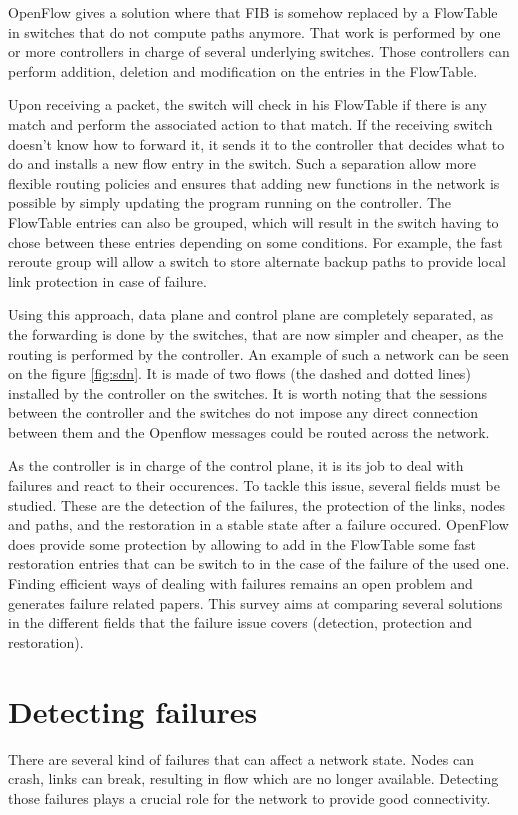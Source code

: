 \documentclass[]{IEEEtran}
\begin{document}
OpenFlow gives a solution where that FIB is somehow replaced by a FlowTable in switches that do not compute paths anymore. That work is performed by one or more controllers in charge of several underlying switches. Those controllers can perform addition, deletion and modification on the entries in the FlowTable.

Upon receiving a packet, the switch will check in his FlowTable if there is any match and perform the associated action to that match. If the receiving switch doesn't know how to forward it, it sends it to the controller that decides what to do and installs a new flow entry in the switch. Such a separation allow more flexible routing policies and ensures that adding new functions in the network is possible by simply updating the program running on the controller. The FlowTable entries can also be grouped, which will result in the switch having to chose between these entries depending on some conditions. For example, the fast reroute group will allow a switch to store alternate backup paths to provide local link protection in case of failure.

Using this approach, data plane and control plane are completely separated, as the forwarding is done by the switches, that are now simpler and cheaper, as the routing is performed by the controller. An example of such a network can be seen on the figure \ref{fig:sdn}. It is made of two flows (the dashed and dotted lines) installed by the controller on the switches. It is worth noting that the sessions between the controller and the switches do not impose any direct connection between them and the Openflow messages could be routed across the network.

As the controller is in charge of the control plane, it is its job to deal with failures and react to their occurences. To tackle this issue, several fields must be studied. These are the detection of the failures, the protection of the links, nodes and paths, and the restoration in a stable state after a failure occured. OpenFlow does provide some protection by allowing to add in the FlowTable some fast restoration entries that can be switch to in the case of the failure of the used one. Finding efficient ways of dealing with failures remains an open problem and generates failure related papers. This survey aims at comparing several solutions in the different fields that the failure issue covers (detection, protection and restoration).

\section{Detecting failures}
There are several kind of failures that can affect a network state. Nodes can crash, links can break, resulting in flow which are no longer available. Detecting those failures plays a crucial role for the network to provide good connectivity.
\end{document}
